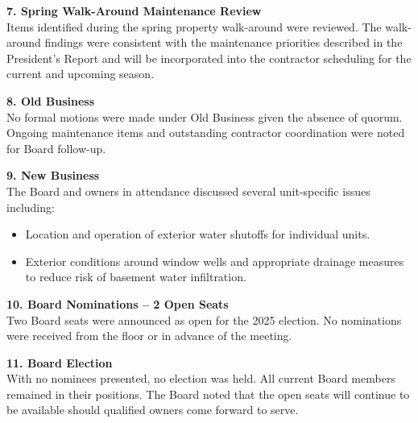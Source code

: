 \documentclass[11pt]{article}
\newcommand{\strong}[1]{\textbf{#1}}
\begin{document}
\vspace{0.75em}

\noindent
\strong{7. Spring Walk-Around Maintenance Review}\\[0.5em]
Items identified during the spring property walk-around were reviewed. The walk-around
findings were consistent with the maintenance priorities described in the President's Report
and will be incorporated into the contractor scheduling for the current and upcoming season.

\vspace{0.75em}

\noindent
\strong{8. Old Business}\\[0.5em]
No formal motions were made under Old Business given the absence of quorum. Ongoing
maintenance items and outstanding contractor coordination were noted for Board follow-up.

\vspace{0.75em}

\noindent
\strong{9. New Business}\\[0.5em]
The Board and owners in attendance discussed several unit-specific issues including:

\begin{itemize}[leftmargin=1.1em]
    \item Location and operation of exterior water shutoffs for individual units.
    \item Exterior conditions around window wells and appropriate drainage measures to
    reduce risk of basement water infiltration.
\end{itemize}

\vspace{0.75em}

\noindent
\strong{10. Board Nominations -- 2 Open Seats}\\[0.5em]
Two Board seats were announced as open for the 2025 election. No nominations were received
from the floor or in advance of the meeting.

\vspace{0.75em}

\noindent
\strong{11. Board Election}\\[0.5em]
With no nominees presented, no election was held. All current Board members remained in
their positions. The Board noted that the open seats will continue to be available should
qualified owners come forward to serve.

\vspace{0.75em}
\end{document}
